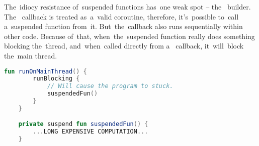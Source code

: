 \warning The~idiocy resistance of~suspended functions has~one weak spot -- the~ builder.
The~ callback is treated as~a~valid coroutine, therefore, it's~possible to~call a~suspended function from~it.
But~the~callback also runs sequentially within other code.
Because of~that, when~the~suspended function really does something blocking the~thread, and~when~called directly from a~ callback, it~will~block the~main \mbox{thread.}

\begin{lstlisting}[language=Kotlin]
    fun runOnMainThread() {
        runBlocking {
            // Will cause the program to stuck.
            suspendedFun()
        }
    }

    private suspend fun suspendedFun() {
        ...LONG EXPENSIVE COMPUTATION...
    }
\end{lstlisting}
